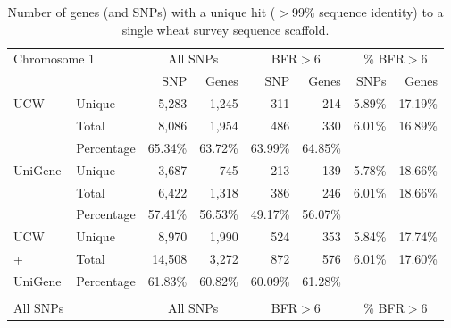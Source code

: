 \begin{table}
\caption{ Number of genes (and SNPs) with a unique hit ($>99\%$ sequence identity) to a single wheat survey sequence scaffold. }
\label{tab:yr15:mappedGenes}
\centering
\begin{localsize}{9}{11}
\begin{tabular}{llrr@{\extracolsep{6pt}}rr@{\extracolsep{6pt}}rr}

\toprule
 \multicolumn{2}{l}{Chromosome 1}            &  \multicolumn{2}{c}{All SNPs} &  \multicolumn{2}{c}{BFR\ensuremath{>}6 }  &    \multicolumn{2}{c}{ \%  BFR\ensuremath{>}6 }       \\
  \cline{3-4}
  \cline{5-6}
  \cline{7-8}
                &            & SNP        & Genes  & SNP     & Genes  & SNPs               & Genes  \\
\midrule
 UCW            & Unique     & 5,283      & 1,245  & 311     & 214    & 5.89\%              & 17.19\% \\
                & Total      & 8,086      & 1,954  & 486     & 330    & 6.01\%              & 16.89\% \\
                & Percentage & 65.34\%     & 63.72\% & 63.99\%  & 64.85\% &                    &        \\
 \midrule
 UniGene        & Unique     & 3,687      & 745    & 213     & 139    & 5.78\%              & 18.66\% \\
                & Total      & 6,422      & 1,318  & 386     & 246    & 6.01\%              & 18.66\% \\
                & Percentage & 57.41\%     & 56.53\% & 49.17\%  & 56.07\% &                    &        \\
 \midrule
 UCW  & Unique     & 8,970      & 1,990  & 524     & 353    & 5.84\%              & 17.74\% \\
+              & Total      & 14,508     & 3,272  & 872     & 576    & 6.01\%              & 17.60\% \\
 UniGene       & Percentage & 61.83\%     & 60.82\% & 60.09\%  & 61.28\% &                    &        \\
\bottomrule
                &            &            &        &         &        &                    &        \\
\toprule
 All SNPs       &            &  \multicolumn{2}{c}{All SNPs} &  \multicolumn{2}{c}{BFR\ensuremath{>}6 }  &    \multicolumn{2}{c}{ \% BFR\ensuremath{>}6 }         \\
\cline{3-4}
\cline{5-6}
\cline{7-8}

\end{tabular}
\end{localsize}
\end{table}
